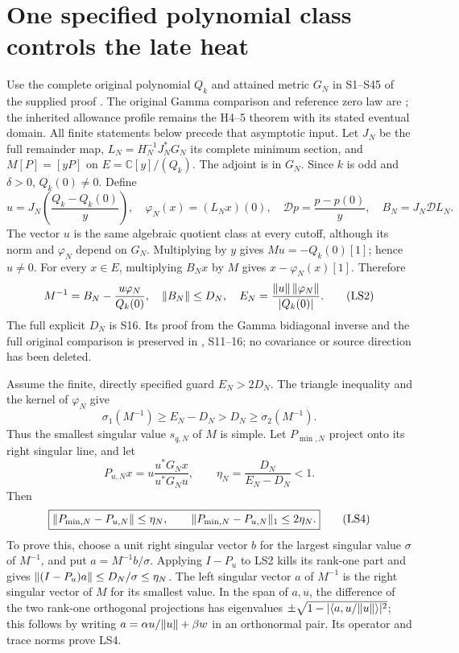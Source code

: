 \documentclass[11pt]{article}
\providecommand{\C}{\mathbb C}\providecommand{\R}{\mathbb R}
\begin{document}
\section{One specified polynomial class controls the late heat}
Use the complete original polynomial $Q_k$ and attained metric $G_N$
in S1--S45 of the supplied proof \cite{ls-Smallest}. The original
Gamma comparison and reference zero law are
\cite[NG2--3, NG6--16]{ls-NG}; the inherited allowance profile remains
the H4--5 theorem with its stated eventual domain.
All finite statements below precede that asymptotic input.
Let $J_N$ be the full remainder map,
$L_N=H_N^{-1}J_N^*G_N$ its complete minimum section, and
$M[P]=[yP]$ on $E=\C[y]/(Q_k)$. The adjoint is in $G_N$.
Since $k$ is odd and $\delta>0$, $Q_k(0)\ne0$. Define
\[
u=J_N\!\left(\frac{Q_k-Q_k(0)}y\right),\quad
\varphi_N(x)=(L_Nx)(0),\quad
\mathscr Dp=\frac{p-p(0)}y,\quad
B_N=J_N\mathscr D L_N.
\tag{LS1}
\]
The vector $u$ is the same algebraic quotient class at every
cutoff, although its norm and $\varphi_N$ depend on $G_N$.
Multiplying by $y$ gives $Mu=-Q_k(0)[1]$; hence $u\ne0$.
For every $x\in E$, multiplying $B_Nx$ by $M$ gives
$x-\varphi_N(x)[1]$. Therefore
\[
M^{-1}=B_N-\frac{u\varphi_N}{Q_k(0)},\quad
\lVert B_N\rVert\le D_N,\quad
E_N=\frac{\lVert u\rVert\,\lVert\varphi_N\rVert}{|Q_k(0)|}.
\tag{LS2}
\]
The full explicit $D_N$ is S16. Its proof from the Gamma
bidiagonal inverse and the full original comparison is preserved
in \cite{ls-Smallest}, S11--16; no covariance or source direction
has been deleted.

Assume the finite, directly specified guard $E_N>2D_N$.
The triangle inequality and the kernel of $\varphi_N$ give
\[
\sigma_1(M^{-1})\ge E_N-D_N>D_N\ge\sigma_2(M^{-1}).
\tag{LS3}
\]
Thus the smallest singular value $s_{q,N}$ of $M$ is simple.
Let $P_{\min,N}$ project onto its right singular line, and let
\[
P_{u,N}x=u\frac{u^*G_Nx}{u^*G_Nu},\qquad
\eta_N=\frac{D_N}{E_N-D_N}<1.
\]
Then
\[
\boxed{\lVert P_{\min,N}-P_{u,N}\rVert\le\eta_N,\qquad
\lVert P_{\min,N}-P_{u,N}\rVert_1\le2\eta_N.}
\tag{LS4}
\]
To prove this, choose a unit right singular vector $b$ for the largest
singular value $\sigma$ of $M^{-1}$, and put
$a=M^{-1}b/\sigma$. Applying $I-P_u$ to LS2 kills its rank-one
part and gives $\lVert(I-P_u)a\rVert\le D_N/\sigma\le\eta_N$.
The left singular vector $a$ of $M^{-1}$ is the right singular
vector of $M$ for its smallest value. In the span of $a,u$,
the difference of the two rank-one orthogonal projections has
eigenvalues $\pm\sqrt{1-|\langle a,u/\lVert u\rVert\rangle|^2}$;
this follows by writing $a=\alpha u/\lVert u\rVert+\beta w$
in an orthonormal pair. Its operator and trace norms prove LS4.
\end{document}
